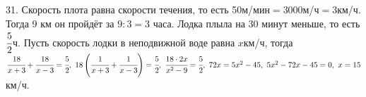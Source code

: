 31. Скорость плота равна скорости течения, то есть 50м/мин$=$3000м/ч$=$3км/ч. Тогда 9 км он пройдёт за $9:3=3$ часа. Лодка плыла на 30 минут меньше, то есть $\cfrac{5}{2}$ч. Пусть скорость лодки в неподвижной воде равна $x$км/ч, тогда $\cfrac{18}{x+3}+\cfrac{18}{x-3}=\cfrac{5}{2},\
18\left(\cfrac{1}{x+3}+\cfrac{1}{x-3}\right)=\cfrac{5}{2},\ \cfrac{18\cdot2x}{x^2-9}=\cfrac{5}{2},\ 72x=5x^2-45,\ 5x^2-72x-45=0,\ x=15$км/ч.\\
